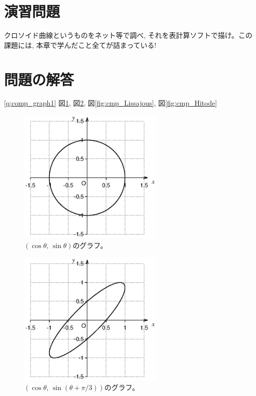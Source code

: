 \section*{演習問題}

\begin{exq}\label{q:clothoid} クロソイド曲線というものをネット等で調べ, 
それを表計算ソフトで描け。この課題には, 本章で学んだこと全てが詰まっている!\end{exq}

\vv


\section*{問題の解答}


\ref{q:comp_graph1}  図\ref{fig:cmp_circle}, 図\ref{fig:cmp_ellipse1}, 
       図\ref{fig:cmp_Lissajous}, 図\ref{fig:cmp_Hitode}
\begin{figure}[!h]
    \centering
    \includegraphics[width=7.0cm]{cmp_circle.eps}
    \caption{$(\cos \theta,\, \sin \theta)$のグラフ。\label{fig:cmp_circle}}
\end{figure}

\begin{figure}[!h]
    \centering
    \includegraphics[width=7.0cm]{cmp_ellipse1.eps}
    \caption{$(\cos \theta,\, \sin (\theta+\pi/3))$のグラフ。\label{fig:cmp_ellipse1}}
\end{figure}

